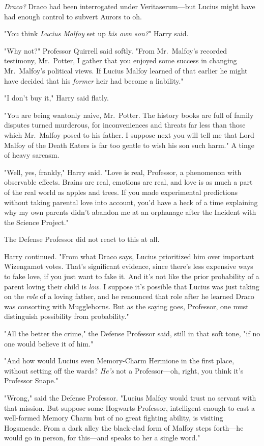 \emph{Draco?} Draco had been interrogated under Veritaserum---but Lucius might
have had enough control to subvert Aurors to{\el} oh.

"You think \emph{Lucius Malfoy} set up \emph{his own son?}" Harry said.

"Why not?" Professor Quirrell said softly. "From Mr.~Malfoy's recorded
testimony, Mr.~Potter, I gather that you enjoyed some success in changing
Mr.~Malfoy's political views. If Lucius Malfoy learned of that earlier{\el}
he might have decided that his \emph{former} heir had become a liability."

"I don't buy it," Harry said flatly.

"You are being wantonly naive, Mr.~Potter. The history books are full of family
disputes turned murderous, for inconveniences and threats far less than those
which Mr.~Malfoy posed to his father. I suppose next you will tell me that Lord
Malfoy of the Death Eaters is far too gentle to wish his son such harm." A
tinge of heavy sarcasm.

"Well, yes, frankly," Harry said. "Love is real, Professor, a phenomenon with
observable effects. Brains are real, emotions are real, and love is as much a
part of the real world as apples and trees. If you made experimental
predictions without taking parental love into account, you'd have a heck of a
time explaining why my own parents didn't abandon me at an orphanage after the
Incident with the Science Project."

The Defense Professor did not react to this at all.

Harry continued. "From what Draco says, Lucius prioritized him over important
Wizengamot votes. That's significant evidence, since there's less expensive
ways to fake love, if you just want to fake it. And it's not like the prior
probability of a parent loving their child is \emph{low}. I suppose it's
possible that Lucius was just taking on the \emph{role} of a loving father, and
he renounced that role after he learned Draco was consorting with Muggleborns.
But as the saying goes, Professor, one must distinguish possibility from
probability."

"All the better the crime," the Defense Professor said, still in that soft
tone, "if no one would believe it of him."

"And how would Lucius even Memory-Charm Hermione in the first place, without
setting off the wards? \emph{He's} not a Professor---oh, right, you think it's
Professor Snape."

"Wrong," said the Defense Professor. "Lucius Malfoy would trust no servant with
that mission. But suppose some Hogwarts Professor, intelligent enough to cast a
well-formed Memory Charm but of no great fighting ability, is visiting
Hogsmeade. From a dark alley the black-clad form of Malfoy steps forth---he
would go in person, for this---and speaks to her a single word."

